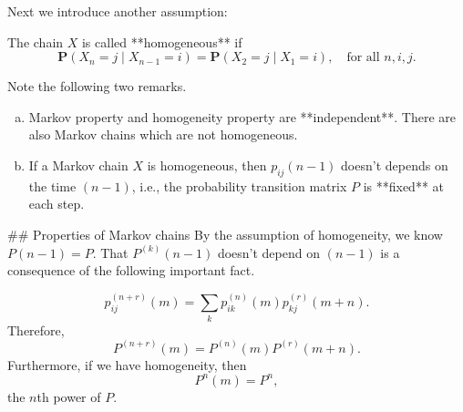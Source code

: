 Next we introduce another assumption:
\begin{definition}
The chain $X$ is called **homogeneous** if
\begin{equation*}
    \mathbf{P}(X_n = j \;\vert\; X_{n-1} = i) = \mathbf{P}(X_2 = j \;\vert\; X_1 = i), \quad \text{for all } n, i, j.
\end{equation*}
\end{definition}

\begin{remark}
Note the following two remarks.
\begin{enumerate}[(a)]
    \item Markov property and homogeneity property are **independent**. There are also Markov chains which are not homogeneous. 
    \item If a Markov chain $X$ is homogeneous, then $p_{ij}(n-1)$ doesn't depends on the time $(n-1)$, i.e., the probability transition matrix $P$ is **fixed** at each step.
\end{enumerate}
\end{remark}

## Properties of Markov chains
By the assumption of homogeneity, we know $P(n-1) = P$. That $P^{(k)}(n-1)$ doesn't depend on $(n-1)$ is a consequence of the following important fact.

\begin{theorem}
\begin{equation*}
    p_{ij}^{(n+r)}(m) = \sum_{k} p_{ik}^{(n)}(m) p_{kj}^{(r)}(m+n).
\end{equation*}
Therefore, 
\begin{equation*}
    P^{(n+r)}(m) = P^{(n)}(m) P^{(r)}(m+n).
\end{equation*}
Furthermore, if we have homogeneity, then 
\begin{equation*}
    P^{n}(m) = P^n,
\end{equation*}
the $n$th power of $P$.
\end{theorem}

